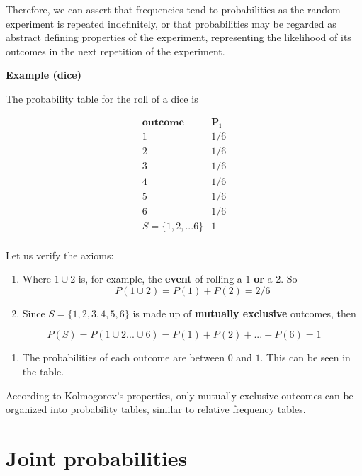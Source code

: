 \documentclass[
]{book}
\providecommand{\tightlist}{%
  \setlength{\itemsep}{0pt}\setlength{\parskip}{0pt}}
\begin{document}
Therefore, we can assert that frequencies tend to probabilities as the random experiment is repeated indefinitely, or that probabilities may be regarded as abstract defining properties of the experiment, representing the likelihood of its outcomes in the next repetition of the experiment.

\textbf{Example (dice)}

The probability table for the roll of a dice is

\[
\begin{array}{cc}
\mathbf{outcome}  & \mathbf{P_i} \\
1  & 1/6 \\
2  & 1/6 \\
3  & 1/6 \\
4  & 1/6 \\
5  & 1/6 \\
6  & 1/6 \\ \hline
S=\{1, 2, ... 6\} & 1 \\ 
\end{array}
\]

Let us verify the axioms:

\begin{enumerate}
\def\labelenumi{\arabic{enumi})}
\item
  Where \(1 \cup 2\) is, for example, the \textbf{event} of rolling a \(1\) \textbf{or} a \(2\). So \[ P( 1 \cup 2)=P(1)+P(2)=2/6\]
\item
  Since \(S= \{ 1,2,3,4,5,6\}\) is made up of \textbf{mutually exclusive} outcomes, then
\end{enumerate}

\[P(S)=P(1\cup 2 ... \cup 6) = P(1)+P(2)+ ...+P(6)=1\]

\begin{enumerate}
\def\labelenumi{\arabic{enumi})}
\setcounter{enumi}{2}
\tightlist
\item
  The probabilities of each outcome are between \(0\) and \(1\). This can be seen in the table.
\end{enumerate}

According to Kolmogorov's properties, only mutually exclusive outcomes can be organized into probability tables, similar to relative frequency tables.

\hypertarget{joint-probabilities}{%
\section{Joint probabilities}\label{joint-probabilities}}
\end{document}
